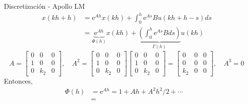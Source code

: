 \documentclass[presentation,aspectratio=1610]{beamer}
\begin{document}
\begin{frame}[label={sec:orgdb624c7}]{Discretización - Apollo LM}
 \begin{align*}
  x(kh+h) &= \mathrm{e}^{Ah} x(kh) + \int_{0}^{h} \mathrm{e}^{As} B u(kh+h-s) ds\\
   &= \underbrace{\mathrm{e}^{Ah}}_{\Phi(h)} x(kh) + \underbrace{\left(\int_{0}^h \mathrm{e}^{As} B ds \right)}_{\Gamma(h)} u(kh)
\end{align*}
\[ A = \begin{bmatrix} 0 & 0 & 0\\1 & 0 & 0\\0 & k_2 & 0\end{bmatrix}, \quad A^2 = \begin{bmatrix} 0 & 0 & 0\\1 & 0 & 0\\0 & k_2 & 0\end{bmatrix}\begin{bmatrix} 0 & 0 & 0\\1 & 0 & 0\\0 & k_2 & 0\end{bmatrix}= \begin{bmatrix} 0 & 0 & 0\\0 & 0 & 0\\k_2 & 0  & 0\end{bmatrix}, \quad A^3 = 0\]
Entonces,
\begin{align*}
 \Phi(h) &= \mathrm{e}^{Ah} = 1 + Ah + A^2 h^2/2  + \cdots \\
 &= &
 \end{align*}
\end{frame}
\end{document}
